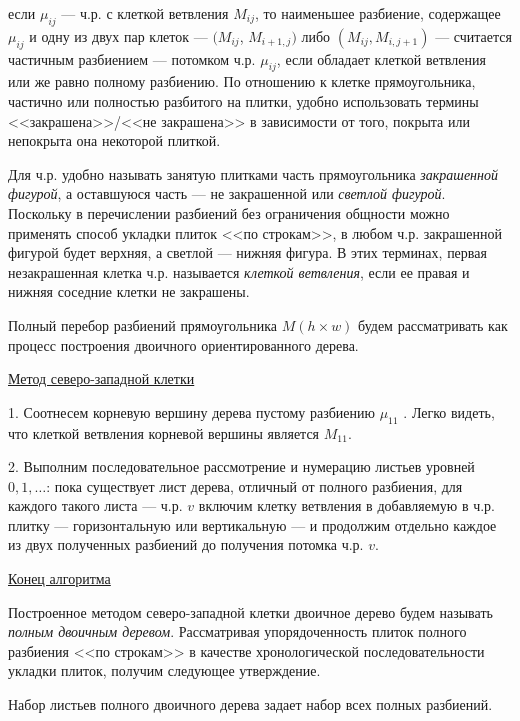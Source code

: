 если $\mu_{ij}$ --- ч.р. с клеткой ветвления $M_{ij}$, то наименьшее разбиение, содержащее $\mu_{ij}$ и одну из двух пар клеток --- $(M_{ij}$, $M_{i+1,j})$ либо $(M_{ij}, M_{i,j+1})$ --- считается частичным разбиением --- потомком ч.р. $\mu_{ij}$, если обладает клеткой ветвления или же равно полному разбиению.
По отношению к клетке прямоугольника, частично или полностью разбитого на плитки, удобно использовать термины <<закрашена>>/<<не закрашена>> в зависимости от того, покрыта или непокрыта она некоторой плиткой.

Для ч.р. удобно называть занятую плитками часть прямоугольника \textit{ закрашенной фигурой}, а оставшуюся часть --- не закрашенной или \textit{ светлой фигурой}. Поскольку в перечислении разбиений без ограничения общности можно применять способ укладки плиток <<по строкам>>, в любом ч.р. закрашенной фигурой будет верхняя, а светлой --- нижняя фигура. В этих терминах, первая незакрашенная клетка ч.р. называется \textit{ клеткой ветвления}, если ее правая и нижняя соседние клетки не закрашены.

Полный перебор разбиений прямоугольника $M(h\times w)$ будем рассматривать как процесс построения двоичного ориентированного дерева.
\par\smallskip
\underline{Метод северо-западной клетки}

1. Соотнесем корневую вершину дерева пустому разбиению $\mu_{11}$ . Легко видеть, что клеткой ветвления корневой вершины является $M_{11}$.

2. Выполним последовательное рассмотрение и нумерацию листьев уровней $0,1,\dots$: пока существует лист дерева, отличный от полного разбиения, для каждого такого листа --- ч.р. $v$ включим клетку ветвления в добавляемую в ч.р. плитку --- горизонтальную или вертикальную --- и продолжим отдельно каждое из двух полученных разбиений до получения потомка ч.р. $v$.

\underline{Конец алгоритма}
\par\smallskip
Построенное методом северо-западной клетки двоичное дерево будем называть \textit{  полным двоичным деревом}. Рассматривая упорядоченность плиток полного разбиения <<по строкам>> в качестве хронологической последовательности укладки плиток, получим следующее утверждение.

\label{the2}
Набор листьев полного двоичного дерева задает набор всех полных разбиений.



